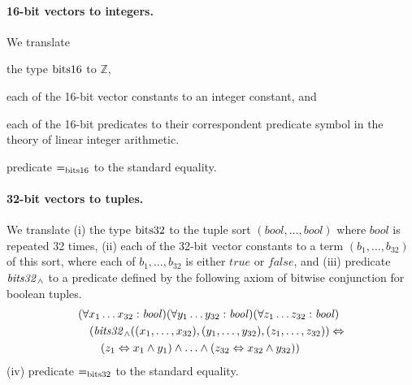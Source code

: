\paragraph{16-bit vectors to integers.}
We translate
\begin{enumerate*}[label=(\roman*)]
  \item the type $\mathrm{bits16}$ to $\mathbb{Z}$,
  \item each of the 16-bit vector constants to an integer constant, and
  \item each of the 16-bit predicates to their correspondent predicate symbol in the theory of linear integer arithmetic.
  \item predicate $\mathit{=}_{\mathrm{bits16}}$ to the standard equality.
\end{enumerate*}

\paragraph{32-bit vectors to tuples.}
We translate
(i) the type $\mathrm{bits32}$ to the tuple sort $(\mathit{bool},\ldots,\mathit{bool})$ where $\mathit{bool}$ is repeated 32 times,
(ii) each of the 32-bit vector constants to a term $(b_1,\ldots,b_{32})$ of this sort, where each of $b_1,\ldots,b_{32}$ is either $\mathit{true}$ or $\mathit{false}$, and
(iii) predicate $\mathit{bits32}_\wedge$ to a predicate defined by the following axiom of bitwise conjunction for boolean tuples.
\begin{equation*}
\begin{aligned}
&(\forall x_1\ldots x_{32}:\mathit{bool})(\forall y_1\ldots y_{32}:\mathit{bool})(\forall z_1\ldots z_{32}:\mathit{bool})\\
&\quad(\mathit{bits32}_\wedge((x_1,\ldots,x_{32}),(y_1,\ldots,y_{32}),(z_1,\ldots,z_{32}))\Leftrightarrow\\
&\quad\quad (z_1\Leftrightarrow x_1\wedge y_1)\wedge\ldots\wedge(z_{32}\Leftrightarrow x_{32}\wedge y_{32}))
\end{aligned}
\end{equation*}
(iv) predicate $\mathit{=}_{\mathrm{bits32}}$ to the standard equality.

